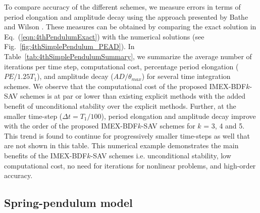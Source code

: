 \documentclass[review]{elsarticle}
\begin{document}
To compare accuracy of the different schemes, we measure errors in terms of period elongation and amplitude decay using the approach presented by Bathe and Wilson \cite{bathe1972stability}.
These measures can be obtained by comparing the exact solution in Eq.~(\ref{eqn:4thPendulumExact}) with the numerical solutions (see Fig.~\ref{fig:4thSimplePendulum_PEAD}).
In Table~\ref{tab:4thSimplePendulumSummary}, we summarize the average number of iterations per time step, computational cost, percentage period elongation ($PE/1.25T_1$), and amplitude decay ($AD/\theta_{max}$) for several time integration schemes.
We observe that the computational cost of the proposed IMEX-BDF$k$-SAV schemes is at par or lower than existing explicit methods with the added benefit of unconditional stability over the explicit methods.
Further, at the smaller time-step ($\Delta t = T_1/100$), period elongation and amplitude decay improve with the order of the proposed IMEX-BDF$k$-SAV schemes for $k$ = 3, 4 and 5.
This trend is found to continue for progressively smaller time-steps as well that are not shown in this table.
This numerical example demonstrates the main benefits of the IMEX-BDF$k$-SAV schemes i.e. unconditional stability, low computational cost, no need for iterations for nonlinear problems, and high-order accuracy.  



\subsection{Spring-pendulum model}
\end{document}
